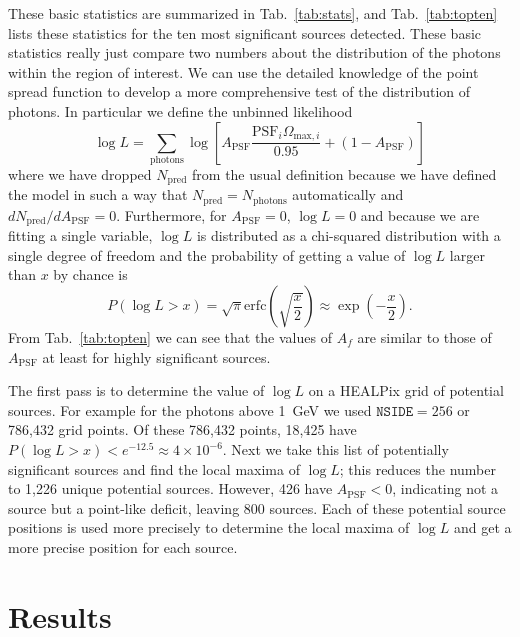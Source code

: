 \documentclass[useAMS,usenatbib]{mn2e}
\begin{document}
These basic statistics are summarized in Tab.~\ref{tab:stats}, and
Tab.~\ref{tab:topten} lists these statistics for the ten most
significant sources detected.  These basic statistics really just
compare two numbers about the distribution of the photons within the
region of interest.  We can use the detailed knowledge of the point
spread function to develop a more comprehensive test of the
distribution of photons.  In particular we define the unbinned
likelihood
\begin{equation}
  \log L = \sum_\mathrm{photons} \log \left [ A_\mathrm{PSF} \frac{\mathrm{PSF}_i \Omega_{\mathrm{max},i} }{0.95} + (1
    - A_\mathrm{PSF}) \right ]
  \label{eq:2}
\end{equation}
where we have dropped $N_\mathrm{pred}$ from the usual definition
because we have defined the model in such a way that
$N_\mathrm{pred}=N_\mathrm{photons}$ automatically and
$d N_\mathrm{pred}/dA_\mathrm{PSF}=0$.  Furthermore, for
$A_\mathrm{PSF}=0$, $\log L=0$ and because we are fitting a single
variable, $\log L$ is distributed as a chi-squared distribution with a
single degree of freedom and the probability of getting a value
of $\log L$ larger than $x$ by chance is
\begin{equation}
  P(\log L > x) = \sqrt{\pi} \mathrm{erfc} \left ( \sqrt{\frac{x}{2}}
  \right ) \approx \exp \left (-\frac{x}{2} \right ).
  \label{eq:4}
\end{equation}
From Tab.~\ref{tab:topten} we can see that the values of $A_f$ are
similar to those of $A_\mathrm{PSF}$ at least for highly significant
sources.

The first pass is to determine the value of $\log L$ on a HEALPix grid
of potential sources.  For example for the photons above 1~GeV we used
$\mathtt{NSIDE}=256$ or 786,432 grid points.  Of these 786,432 points,
18,425 have $P(\log L >x) < e^{-12.5} \approx 4 \times 10^{-6}$.  Next
we take this list of potentially significant sources and find the
local maxima of $\log L$; this reduces the number to 1,226 unique
potential sources.  However, 426 have $A_\mathrm{PSF}<0$, indicating
not a source but a point-like deficit, leaving 800 sources.  Each of
these potential source positions is used more precisely to determine
the local maxima of $\log L$ and get a more precise position for each
source.


\section{Results}
\end{document}
